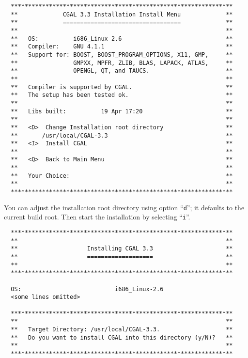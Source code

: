 {\ccTexHtml{\scriptsize}{}
\begin{verbatim}
  ****************************************************************
  **             CGAL 3.3 Installation Install Menu             **
  **             ==================================             **
  **                                                            **
  **   OS:          i686_Linux-2.6                              **
  **   Compiler:    GNU 4.1.1                                   **
  **   Support for: BOOST, BOOST_PROGRAM_OPTIONS, X11, GMP,     **
  **                GMPXX, MPFR, ZLIB, BLAS, LAPACK, ATLAS,     **
  **                OPENGL, QT, and TAUCS.                      **
  **                                                            **
  **   Compiler is supported by CGAL.                           **
  **   The setup has been tested ok.                            **
  **                                                            **
  **   Libs built:          19 Apr 17:20                        **
  **                                                            **
  **   <D>  Change Installation root directory                  **
  **       /usr/local/CGAL-3.3                                  **
  **   <I>  Install CGAL                                        **
  **                                                            **
  **   <Q>  Back to Main Menu                                   **
  **                                                            **
  **   Your Choice:                                             **
  **                                                            **
  ****************************************************************
\end{verbatim}
}

You can adjust the installation root directory using option
``\texttt{d}''; it defaults to the current build root. Then start the
installation by selecting ``\texttt{i}''.

{\ccTexHtml{\scriptsize}{}
\begin{verbatim}
  ****************************************************************
  **                                                            **
  **                    Installing CGAL 3.3                     **
  **                    ===================                     **
  **                                                            **
  ****************************************************************

  OS:                           i686_Linux-2.6
  <some lines omitted>

  ****************************************************************
  **                                                            **
  **   Target Directory: /usr/local/CGAL-3.3.                   **
  **   Do you want to install CGAL into this directory (y/N)?   **
  **                                                            **
  ****************************************************************
\end{verbatim}
}

